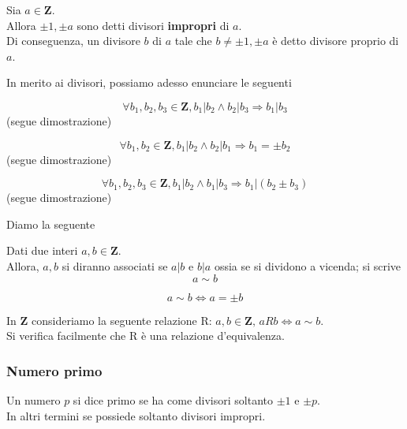 \begin{flushleft}
\begin{definizione}
Sia $a\in \mathbf{Z}$.\\
Allora $\pm 1, \pm a$ sono detti divisori \textbf{impropri} di $a$.\\
Di conseguenza, un divisore $b$ di $a$ tale che $b\neq \pm 1, \pm a$ è detto divisore proprio di $a$.
\end{definizione}

In merito ai divisori, possiamo adesso enunciare le seguenti 

\begin{proprieta}[Transitiva]
\[\forall b_1, b_2, b_3 \in \mathbf{Z}, b_1|b_2 \land b_2|b_3 \Rightarrow b_1 |b_3\]
(segue dimostrazione)\\
\vspace{100px}
\end{proprieta}

\begin{proprieta}
\[\forall b_1, b_2 \in \mathbf{Z}, b_1|b_2 \land b_2|b_1 \Rightarrow b_1 = \pm b_2\]
(segue dimostrazione)\\
\vspace{150px}
\end{proprieta}


\begin{proprieta}
\[\forall b_1, b_2, b_3 \in \mathbf{Z}, b_1|b_2 \land b_1|b_3 \Rightarrow b_1 |(b_2 \pm b_3)\]
(segue dimostrazione)\\
\vspace{100px}
\end{proprieta}

Diamo la seguente
\begin{definizione}
Dati due interi $a, b \in \mathbf{Z}$.\\
Allora, $a, b$ si diranno associati se $a|b$ e $b|a$ ossia se si dividono a vicenda; si scrive
\[a\sim b\]
\end{definizione}
\begin{osservazione}
\[a\sim b \Leftrightarrow a = \pm b\]
\end{osservazione}
\begin{osservazione}
In $\mathbf{Z}$ consideriamo la seguente relazione R: $a,b \in \mathbf{Z},\,aRb\Leftrightarrow a\sim b$.\\
Si verifica facilmente che R è una relazione d'equivalenza.
\end{osservazione}
\subsubsection{Numero primo}
Un numero $p$ si dice primo se ha come divisori soltanto $\pm 1$ e $\pm p$.\\
In altri termini se possiede soltanto divisori impropri.


\end{flushleft}
